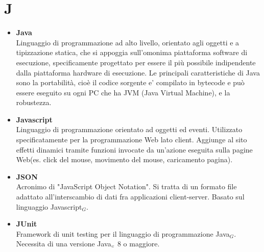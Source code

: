 \chapter{J} \label{J}
\begin{itemize}
	\item \textbf{Java} \\
	 Linguaggio di programmazione ad alto livello, orientato agli oggetti e a tipizzazione statica, che si appoggia sull'omonima piattaforma software di esecuzione, specificamente progettato per essere il più possibile indipendente dalla piattaforma hardware di esecuzione. Le principali caratteristiche di Java sono la portabilità, cioè il codice sorgente e' compilato in bytecode e può essere eseguito su ogni PC che ha JVM (Java Virtual Machine), e la robustezza.

	 \item \textbf{Javascript} \\
	 Linguaggio di programmazione orientato ad oggetti ed eventi.
	 Utilizzato specificatamente per la programmazione Web lato client.
	 Aggiunge al sito effetti dinamici tramite funzioni invocate da un'azione eseguita sulla pagine Web(es. click del mouse, movimento del mouse, caricamento pagina).

	 \item \textbf{JSON} \\
	 Acronimo di "JavaScript Object Notation".
	 Si tratta di un formato file adattato all'interscambio di dati fra applicazioni client-server.
	 Basato sul linguaggio Javascript$_G$.

	 \item \textbf{JUnit} \\
	 Framework di unit testing per il linguaggio di programmazione Java$_G$.
	 Necessita di una versione Java$_{\scaleto{G}{3pt}}$ 8 o maggiore.
\end{itemize}
